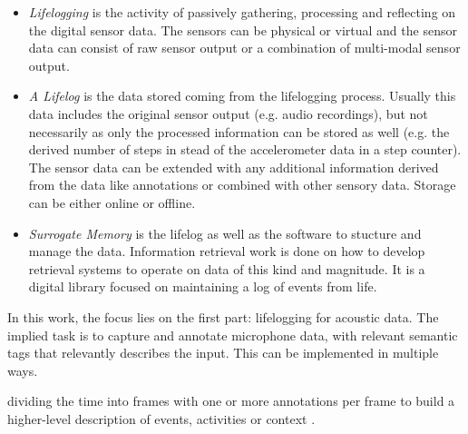 \begin{itemize}
	\item \textit{Lifelogging} is the activity of passively gathering, processing and reflecting on the digital sensor data. The sensors can be physical or virtual and the sensor data can consist of raw sensor output or a combination of multi-modal sensor output. 
	\item \textit{A Lifelog} is the data stored coming from the lifelogging process. Usually this data includes the original sensor output (e.g. audio recordings), but not necessarily as only the processed information can be stored as well (e.g. the derived number of steps in stead of the accelerometer data in a step counter). The sensor data can be extended with any additional information derived from the data like annotations or combined with other sensory data. Storage can be either online or offline.
	\item \textit{Surrogate Memory} is the lifelog as well as the software to stucture and manage the data. Information retrieval work is done on how to develop retrieval systems to operate on data of this kind and magnitude. It is a digital library focused on maintaining a log of events from life.
\end{itemize}

In this work, the focus lies on the first part: lifelogging for acoustic data. The implied task is to capture and annotate microphone data, with relevant semantic tags that relevantly describes the input. This can be implemented in multiple ways.

 dividing the time into frames with one or more annotations per frame to build a higher-level description of events, activities or context \cite{bayindir2017survey}. 

